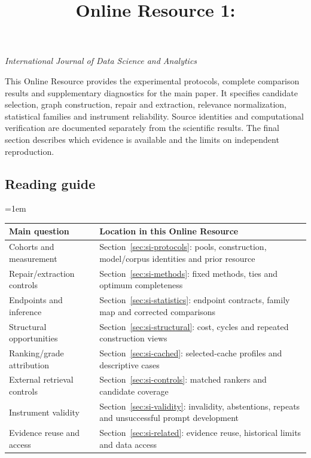 \documentclass[pdflatex,sn-basic,Numbered]{sn-jnl}
\renewcommand{\papertable}{\small\renewcommand{\arraystretch}{1.15}\setlength{\tabcolsep}{4pt}\emergencystretch=1em}
\begin{document}
\title[Online Resource 1]{Online Resource 1: \maintitle}

\maketitle
\begin{center}\textit{International Journal of Data Science and Analytics}\end{center}
This Online Resource provides the experimental protocols, complete comparison results and supplementary diagnostics for the main paper. It specifies candidate selection, graph construction, repair and extraction, relevance normalization, statistical families and instrument reliability. Source identities and computational verification are documented separately from the scientific results. The final section describes which evidence is available and the limits on independent reproduction.

\subsection*{Reading guide}
\begingroup\papertable
\begin{tabularx}{\linewidth}{@{}L{3.0cm}Y@{}}\toprule
Main question & Location in this Online Resource \\\midrule
Cohorts and measurement & Section~\ref{sec:si-protocols}: pools, construction, model/corpus identities and prior resource \\
Repair/extraction controls & Section~\ref{sec:si-methods}: fixed methods, ties and optimum completeness \\
Endpoints and inference & Section~\ref{sec:si-statistics}: endpoint contracts, family map and corrected comparisons \\
Structural opportunities & Section~\ref{sec:si-structural}: cost, cycles and repeated construction views \\
Ranking/grade attribution & Section~\ref{sec:si-cached}: selected-cache profiles and descriptive cases \\
External retrieval controls & Section~\ref{sec:si-controls}: matched rankers and candidate coverage \\
Instrument validity & Section~\ref{sec:si-validity}: invalidity, abstentions, repeats and unsuccessful prompt development \\
Evidence reuse and access & Section~\ref{sec:si-related}: evidence reuse, historical limits and data access \\\bottomrule
\end{tabularx}\endgroup
\end{document}
